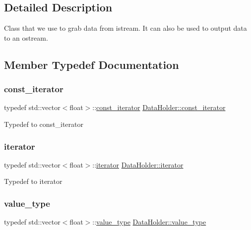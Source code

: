 \subsection{Detailed Description}
Class that we use to grab data from istream. It can also be used to output data to an ostream. 

\subsection{Member Typedef Documentation}
\mbox{\label{classDataHolder_a6284772630d15867fe5549a2903944cd}} 
\subsubsection{\texorpdfstring{const\+\_\+iterator}{const\_iterator}}
{\footnotesize\ttfamily typedef std\+::vector$<$float$>$\+::\hyperlink{classDataHolder_a6284772630d15867fe5549a2903944cd}{const\+\_\+iterator} \hyperlink{classDataHolder_a6284772630d15867fe5549a2903944cd}{Data\+Holder\+::const\+\_\+iterator}}

Typedef to const\+\_\+iterator \mbox{\label{classDataHolder_adecdb7b6c101d8ce9815c2ee2a4596b2}} 
\subsubsection{\texorpdfstring{iterator}{iterator}}
{\footnotesize\ttfamily typedef std\+::vector$<$float$>$\+::\hyperlink{classDataHolder_adecdb7b6c101d8ce9815c2ee2a4596b2}{iterator} \hyperlink{classDataHolder_adecdb7b6c101d8ce9815c2ee2a4596b2}{Data\+Holder\+::iterator}}

Typedef to iterator \mbox{\label{classDataHolder_a6a84dd5b409f0eda7112dee0310e0d19}} 
\subsubsection{\texorpdfstring{value\+\_\+type}{value\_type}}
{\footnotesize\ttfamily typedef std\+::vector$<$float$>$\+::\hyperlink{classDataHolder_a6a84dd5b409f0eda7112dee0310e0d19}{value\+\_\+type} \hyperlink{classDataHolder_a6a84dd5b409f0eda7112dee0310e0d19}{Data\+Holder\+::value\+\_\+type}}


